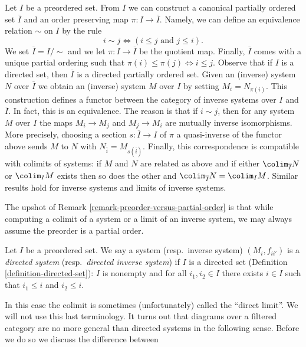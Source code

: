 \begin{remark}
\label{remark-preorder-versus-partial-order}
Let $I$ be a preordered set. From $I$ we can construct a canonical
partially ordered set $\overline{I}$ and an order preserving map
$\pi : I \to \overline{I}$. Namely, we can define an equivalence
relation $\sim$ on $I$ by the rule
$$
i \sim j \Leftrightarrow (i \leq j\text{ and }j \leq i).
$$
We set $\overline{I} = I/\sim$ and we let $\pi : I \to \overline{I}$
be the quotient map. Finally, $\overline{I}$ comes with a unique
partial ordering such that
$\pi(i) \leq \pi(j) \Leftrightarrow i \leq j$.
Observe that if $I$ is a directed set, then $\overline{I}$
is a directed partially ordered set.
Given an (inverse) system $N$ over $\overline{I}$ we obtain an
(inverse) system $M$ over $I$ by setting $M_i = N_{\pi(i)}$.
This construction defines a functor between the category
of inverse systems over $I$ and $\overline{I}$.
In fact, this is an equivalence.
The reason is that if $i \sim j$, then for any system
$M$ over $I$ the maps $M_i \to M_j$ and $M_j \to M_i$ are
mutually inverse isomorphisms. More precisely, choosing
a section $s : \overline{I} \to I$ of $\pi$ a quasi-inverse
of the functor above sends $M$ to $N$ with
$N_{\overline{i}} = M_{s(\overline{i})}$.
Finally, this correspondence is compatible with colimits of systems:
if $M$ and $N$ are related as above and
if either $\colim_{\overline{I}} N$ or $\colim_I M$ exists
then so does the other and
$\colim_{\overline{I}} N = \colim_I M$.
Similar results hold for inverse systems and limits of inverse systems.
\end{remark}

\noindent
The upshot of Remark \ref{remark-preorder-versus-partial-order}
is that while computing a colimit of a system or a limit of
an inverse system, we may always assume the preorder is a partial order.

\begin{definition}
\label{definition-directed-system}
Let $I$ be a preordered set. We say a system (resp.\ inverse system)
$(M_i, f_{ii'})$ is a
{\it directed system} (resp.\ {\it directed inverse system})
if $I$ is a directed set
(Definition \ref{definition-directed-set}): $I$ is nonempty and
for all $i_1, i_2 \in I$ there exists $i\in I$ such that
$i_1 \leq i$ and $i_2 \leq i$.
\end{definition}

\noindent
In this case the colimit is sometimes (unfortunately)
called the ``direct limit''. We will not use this last
terminology. It turns out that diagrams over a filtered
category are no more general than directed systems in the
following sense. Before we do so we discuss the difference
between

